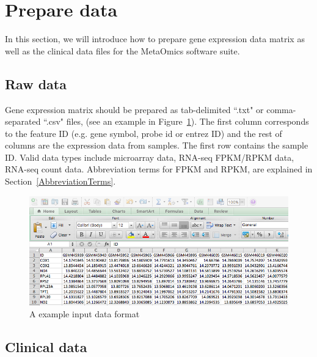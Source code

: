 
\section{Prepare data}
\label{sec:dataPrepare}
In this section, we will introduce how to prepare gene expression data matrix as well as the clinical data files for the MetaOmics software suite.

\subsection{Raw data}

Gene expression matrix should be prepared as tab-delimited ``.txt" or comma-separated ``.csv" files, (see an example in Figure~\ref{fig:dataMicroarray}).
The first column corresponds to the feature ID (e.g. gene symbol, probe id or entrez ID) and the rest of columns are the expression data from samples.
The first row contains the sample ID.
Valid data types include microarray data, RNA-seq FPKM/RPKM data, RNA-seq count data.
Abbreviation terms for FPKM and RPKM, are explained in Section~\ref{AbbreviationTerms}.

\begin{figure}[H]
\begin{center}
\includegraphics[scale=0.5]{./figure/dataPreparation/dataMicroarray_wide}
\caption{A example input data format}
\label{fig:dataMicroarray}
\end{center}
\end{figure}

\subsection{Clinical data}

